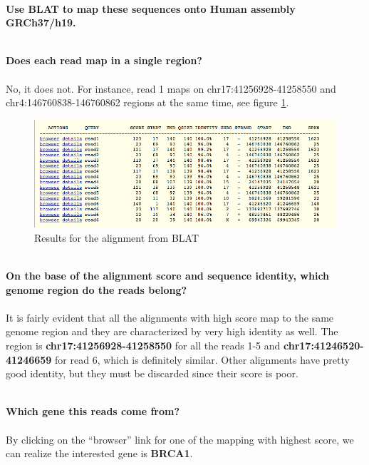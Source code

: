 \documentclass[12pt, a4paper]{article}
\begin{document}
\textbf{\\ Use BLAT to map these sequences onto Human assembly GRCh37/h19.}%

\textbf{\\Does each read map in a single region?}%

\paragraph{}No, it does not. For instance, read 1 maps on chr17:41256928-41258550 and chr4:146760838-146760862 regions at the same time, see figure \ref{BLAT results}.%

\begin{figure}[h]
	\centering
	\label{BLAT results}
	\includegraphics[width = \textwidth]{BLAT_results}
	\caption{Results for the alignment from BLAT}
\end{figure}

\textbf{\\ On the base of the alignment score and sequence identity, which genome region do the reads belong?}%

\paragraph{}It is fairly evident that all the alignments with high score map to the same genome region and they are characterized by very high identity as well. The region is \textbf{chr17:41256928-41258550} for all the reads 1-5 and \textbf{chr17:41246520-41246659} for read 6, which is definitely similar. Other alignments have pretty good identity, but they must be discarded since their score is poor.

\textbf{\\ Which gene this reads come from?}%
\paragraph{}By clicking on the “browser” link for one of the mapping with highest score, we can realize the interested gene is \textbf{BRCA1}.
\end{document}
